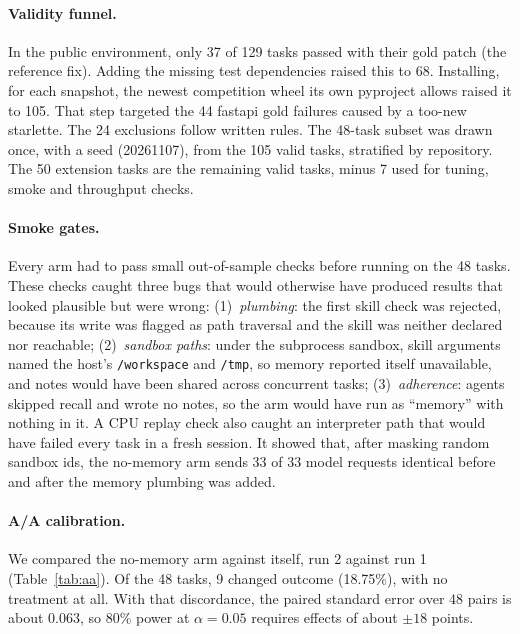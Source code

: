 \documentclass[11pt]{article}
\newcommand{\code}[1]{\texttt{#1}}
\begin{document}
\paragraph{Validity funnel.} In the public environment, only 37 of 129 tasks passed with their gold
patch (the reference fix). Adding the missing test dependencies raised this to 68. Installing, for
each snapshot, the newest competition wheel its own pyproject allows raised it to 105. That step
targeted the 44 fastapi gold failures caused by a too-new starlette. The 24 exclusions follow
written rules. The 48-task subset was drawn once, with a seed (20261107), from the 105 valid tasks,
stratified by repository. The 50 extension tasks are the remaining valid tasks, minus 7 used for
tuning, smoke and throughput checks.

\paragraph{Smoke gates.} Every arm had to pass small out-of-sample checks before running on the 48
tasks. These checks caught three bugs that would otherwise have produced results that looked
plausible but were wrong:
(1)~\emph{plumbing}: the first skill check was rejected, because its write was flagged as path
traversal and the skill was neither declared nor reachable;
(2)~\emph{sandbox paths}: under the subprocess sandbox, skill arguments named the host's
\code{/workspace} and \code{/tmp}, so memory reported itself unavailable, and notes would have been
shared across concurrent tasks;
(3)~\emph{adherence}: agents skipped recall and wrote no notes, so the arm would have run as
``memory'' with nothing in it.
A CPU replay check also caught an interpreter path that would have failed every task in a fresh
session. It showed that, after masking random sandbox ids, the no-memory arm sends 33 of 33 model
requests identical before and after the memory plumbing was added.

\paragraph{A/A calibration.} We compared the no-memory arm against itself, run 2 against run 1
(Table~\ref{tab:aa}). Of the 48 tasks, 9 changed outcome (18.75\%), with no treatment at all. With
that discordance, the paired standard error over 48 pairs is about 0.063, so 80\% power at
$\alpha=0.05$ requires effects of about $\pm18$ points.
\end{document}
